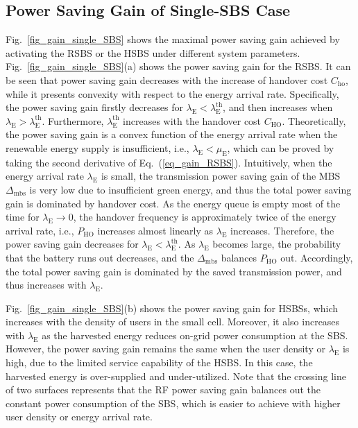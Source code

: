 \documentclass[12pt, draftclsnofoot,onecolumn]{IEEEtran}
\begin{document}
\subsection{Power Saving Gain of Single-SBS Case}

    \begin{figure*}[!t]
        \centering
\hfil
        \caption{Power saving gain of single SBS.}
        \label{fig_gain_single_SBS}
    \end{figure*}

Fig.~\ref{fig_gain_single_SBS} shows the maximal power saving gain achieved by activating the RSBS or the HSBS under different system parameters. Fig.~\ref{fig_gain_single_SBS}(a) shows the power saving gain for the RSBS.
It can be seen that power saving gain decreases with the increase of handover cost $C_\mathrm{ho}$, while it presents convexity with respect to the energy arrival rate.
Specifically, the power saving gain firstly decreases for $\lambda_\mathrm{E}<\lambda^\mathrm{th}_\mathrm{E}$, and then increases when $\lambda_\mathrm{E}>\lambda^\mathrm{th}_\mathrm{E}$.
Furthermore, $\lambda^\mathrm{th}_\mathrm{E}$ increases with the handover cost $C_\mathrm{HO}$.
Theoretically, the power saving gain is a convex function of the energy arrival rate when the renewable energy supply is insufficient, i.e., $\lambda_\mathrm{E}<\mu_\mathrm{E}$, which can be proved by taking the second derivative of Eq.~(\ref{eq_gain_RSBS}).
Intuitively, when the energy arrival rate $\lambda_\mathrm{E}$ is small, the transmission power saving gain of the MBS $\Delta_\mathrm{mbs}$ is very low due to insufficient green energy, and thus the total power saving gain is dominated by handover cost.
As the energy queue is empty most of the time for $\lambda_\mathrm{E}\rightarrow 0$, the handover frequency is approximately twice of the energy arrival rate, i.e., $P_\mathrm{HO}$ increases almost linearly as $\lambda_\mathrm{E}$ increases.
Therefore, the power saving gain decreases for $\lambda_\mathrm{E}<\lambda^\mathrm{th}_\mathrm{E}$.
As $\lambda_\mathrm{E}$ becomes large, the probability that the battery runs out decreases, and the $\Delta_\mathrm{mbs}$ balances $P_\mathrm{HO}$ out.
Accordingly, the total power saving gain is dominated by the saved transmission power, and thus increases with $\lambda_\mathrm{E}$.

Fig.~\ref{fig_gain_single_SBS}(b) shows the power saving gain for HSBSs, which increases with the density of users in the small cell. Moreover, it also increases with $\lambda_\mathrm{E}$ as the harvested energy reduces on-grid power consumption at the SBS. However, the power saving gain remains the same when the user density or $\lambda_\mathrm{E}$ is high, due to the limited service capability of the HSBS. In this case, the harvested energy is over-supplied and under-utilized. Note that the crossing line of two surfaces represents that the RF power saving gain balances out the constant power consumption of the SBS, which is easier to achieve with higher user density or energy arrival rate.
\end{document}
